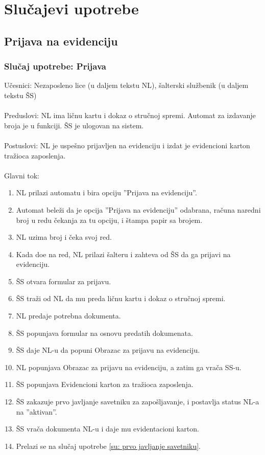 \section{Slu\v cajevi upotrebe}

\subsection{Prijava na evidenciju}


\subsubsection{Slu\v caj upotrebe: Prijava}

\noindent U\v cesnici: Nezaposleno lice (u daljem tekstu NL), \v salterski slu\v zbenik (u daljem tekstu \v SS)
\\
\\ Preduslovi: NL ima li\v cnu kartu i dokaz o stru\v cnoj spremi. Automat za izdavanje broja je u funkciji. \v SS je ulogovan na sistem. 
\\
\\ Postuslovi: NL je uspe\v sno prijavljen na evidenciju i izdat je evidencioni karton tra\v zioca zaposlenja.
\\
\\ Glavni tok:
\begin{enumerate}
	\item NL prilazi automatu i bira opciju ''Prijava na evidenciju''.
	\item Automat bele\v zi da je opcija ''Prijava na evidenciju'' odabrana, ra\v cuna naredni broj u redu \v cekanja za tu opciju, i \v stampa papir sa brojem.
	\item NL uzima broj i \v ceka svoj red.
	\item Kada do\dj e na red, NL prilazi \v salteru i zahteva od \v SS da ga prijavi na evidenciju.
	\item \v SS otvara formular za prijavu.
	\item \v SS tra\v zi od NL da mu preda li\v cnu kartu i dokaz o stru\v cnoj spremi.
	\item NL predaje potrebna dokumenta. 
	\item \v SS popunjava formular na osnovu predatih dokumenata.
	\item \v SS daje NL-u da popuni Obrazac za prijavu na evidenciju.
	\item NL popunjava Obrazac za prijavu na evidenciju, a zatim ga vra\v ca SS-u.
	\item \v SS popunjava Evidencioni karton za tra\v zioca zaposlenja.
	\item \v SS zakazuje prvo javljanje savetniku za zapo\v sljavanje, i postavlja status NL-a na ''aktivan''.
	\item \v SS vra\v ca dokumenta NL-u i daje mu evidentacioni karton.
	\item Prelazi se na slu\v caj upotrebe \ref{su: prvo javljanje savetniku}.
\end{enumerate}

